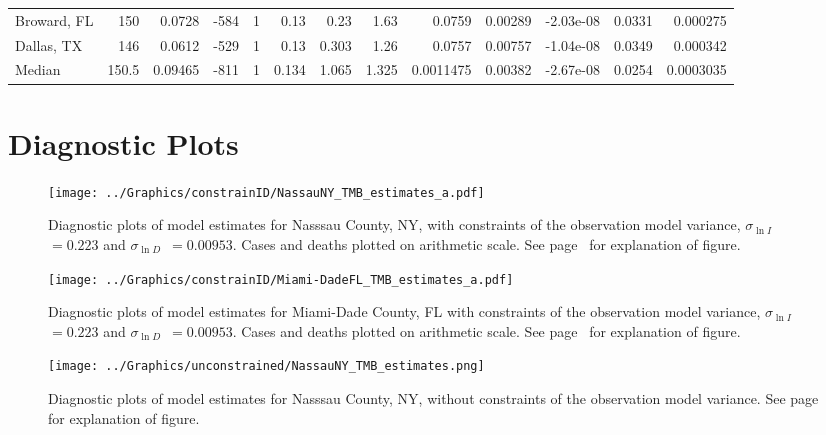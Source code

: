 \documentclass[12pt,letterpaper]{article}
\newcommand\slI{$\sigma_{\ln I}$\ }
\newcommand\slD{$\sigma_{\ln D}$}
\begin{document}
\begin{appendices}
\begin{sidewaystable}
{\begin{tabular}{lrrrrrrrrrrrr}
 Broward, FL        & 150   & 0.0728  &  -584 &     1 &           0.13  &            0.23  &          1.63  &    0.0759    &     0.00289  &        -2.03e-08 &           0.0331  &       0.000275  \\
 Dallas, TX         & 146   & 0.0612  &  -529 &     1 &           0.13  &            0.303 &          1.26  &    0.0757    &     0.00757  &        -1.04e-08 &           0.0349  &       0.000342  \\
\hline
 Median             & 150.5 & 0.09465 &  -811 &     1 &           0.134 &            1.065 &          1.325 &    0.0011475 &     0.00382  &        -2.67e-08 &           0.0254  &       0.0003035 \\
\hline
\end{tabular}

}\end{sidewaystable}



\clearpage
\section{Diagnostic Plots}

\begin{figure}[h!]
\begin{center}
\texttt{[image: ../Graphics/constrainID/NassauNY\_TMB\_estimates\_a.pdf]}
\end{center}
\caption{\label{fig:estsNaNYca}
Diagnostic plots of model estimates for Nasssau County, NY, 
with constraints of the observation model variance, 
\slI~$ = 0.223$ and \slD~$= 0.00953$. 
Cases and deaths plotted on arithmetic scale.
See page~\pageref{pp:diagexpl} for explanation of figure.
}
\end{figure}
\clearpage

\begin{figure}
\begin{center}
\texttt{[image: ../Graphics/constrainID/Miami-DadeFL\_TMB\_estimates\_a.pdf]}
\end{center}
\caption{\label{fig:estsMDFLca}
Diagnostic plots of model estimates for Miami-Dade County, FL
with constraints of the observation model variance, 
\slI~$ = 0.223$ and \slD~$= 0.00953$. 
Cases and deaths plotted on arithmetic scale.
See page~\pageref{pp:diagexpl} for explanation of figure.
}
\end{figure}

\begin{figure}[h!]
\begin{center}
\texttt{[image: ../Graphics/unconstrained/NassauNY\_TMB\_estimates.png]}
\end{center}
\caption{\label{fig:estsNaNYu}
Diagnostic plots of model estimates for Nasssau County, NY, 
without constraints of the observation model variance. 
See page~\pageref{pp:diagexpl} for explanation of figure.
}
\end{figure}
\clearpage


\end{appendices}
\end{document}
